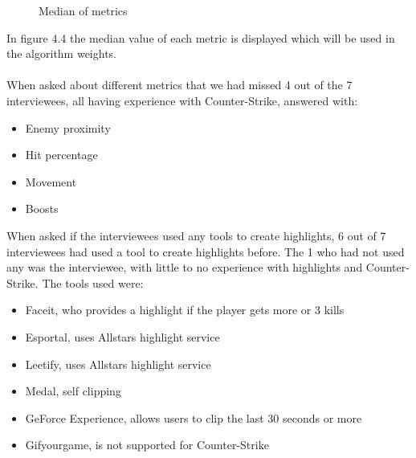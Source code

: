     \begin{figure}[H]
        \centering
\caption{Median of metrics}
\label{fig:medianMetrics}
\end{figure}
In figure 4.4 the median value of each metric is displayed which will be used in the algorithm weights.\\\\

When asked about different metrics that we had missed 4 out of the 7 interviewees, all having experience with Counter-Strike, answered with:
\begin{itemize}
    \item Enemy proximity
    \item Hit percentage
    \item \gls{Movement}
    \item \gls{Boosts}
\end{itemize}
When asked if the interviewees used any tools to create highlights, 6 out of 7 interviewees had used a tool to create highlights before. The 1 who had not used any was the interviewee, with little to no experience with highlights and Counter-Strike. The tools used were:
\begin{itemize}
    \item \gls{Faceit}, who provides a highlight if the player gets more or 3 kills
    \item \gls{Esportal}, uses Allstars highlight service
    \item \gls{Leetify}, uses Allstars highlight service
    \item \gls{Medal}, self clipping
    \item \gls{GeForce Experience}, allows users to clip the last 30 seconds or more
    \item \gls{Gifyourgame}, is not supported for Counter-Strike
\end{itemize}
